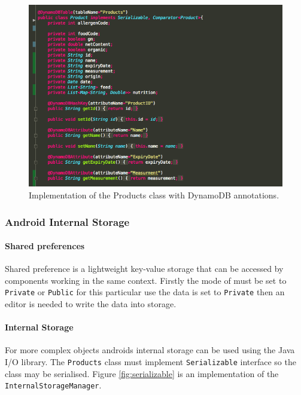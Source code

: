 \documentclass[a4paper, 11pt]{article}
\begin{document}
\vspace{\baselineskip}

\begin{figure}[!htbp]
\centering
\includegraphics[width=\textwidth]{products}
\caption{Implementation of the Products class with DynamoDB annotations.}\label{fig:products}
\end{figure}

\subsubsection{Android Internal Storage}
\paragraph{Shared preferences}
Shared preference is a lightweight key-value storage that can be accessed by components working in the same context. Firstly the mode of must be set to \texttt{Private} or \texttt{Public} for this particular use the data is set to \texttt{Private} then an editor is needed to write the data into storage. 

\paragraph{Internal Storage} 
For more complex objects androids internal storage can be used using the Java I/O library. The \texttt{Products} class must implement \texttt{Serializable} interface so the class may be serialised. Figure \ref{fig:serializable} is an implementation of the \texttt{InternalStorageManager}. 

\vspace{\baselineskip}
\end{document}
